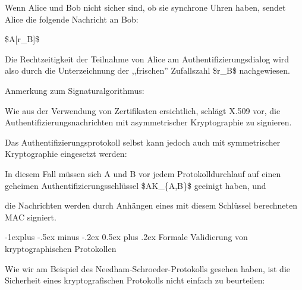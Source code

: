 \documentclass[a4paper]{article}
\makeatletter
\renewcommand{\subsection}{\@startsection{subsection}{2}{0mm}%
 {-1explus -.5ex minus -.2ex}%
 {0.5ex plus .2ex}%
 {\normalfont\normalsize\bfseries}}
\makeatother
\begin{document}
\begin{multicols}{3}
\begin{itemize*}
            \begin{itemize*}
                  \item Wenn Alice und Bob nicht sicher sind, ob sie synchrone Uhren haben, sendet Alice die folgende Nachricht an Bob:
            \end{itemize*}

            \begin{enumerate*}
                  \def\labelenumi{\arabic{enumi}.}
                  \setcounter{enumi}{2}
                  \item \$A{[}r\_B{]}\$
            \end{enumerate*}

            \begin{itemize*}
                  \item Die Rechtzeitigkeit der Teilnahme von Alice am Authentifizierungsdialog wird also durch die Unterzeichnung der ,,frischen'' Zufallszahl \$r\_B\$ nachgewiesen.
            \end{itemize*}
            \item
            Anmerkung zum Signaturalgorithmus:

            \begin{itemize*}
                  \item Wie aus der Verwendung von Zertifikaten ersichtlich, schlägt X.509 vor, die Authentifizierungsnachrichten mit asymmetrischer Kryptographie zu signieren.
                  \item Das Authentifizierungsprotokoll selbst kann jedoch auch mit symmetrischer Kryptographie eingesetzt werden:
                  \begin{itemize*} \item In diesem Fall müssen sich A und B vor jedem Protokolldurchlauf auf einen geheimen Authentifizierungsschlüssel \$AK\_\{A,B\}\$ geeinigt haben, und \item die Nachrichten werden durch Anhängen eines mit diesem Schlüssel berechneten MAC signiert. \end{itemize*}
            \end{itemize*}
      \end{itemize*}


      \subsection{Formale Validierung von kryptographischen
            Protokollen}

      \begin{itemize*}
            \item
            Wie wir am Beispiel des Needham-Schroeder-Protokolls gesehen haben,
            ist die Sicherheit eines kryptografischen Protokolls nicht einfach zu
            beurteilen:


\end{itemize*}
\end{multicols}
\end{document}
